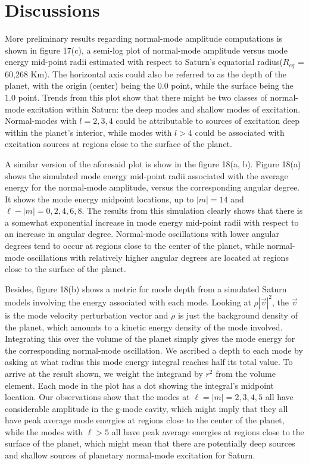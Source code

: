\documentclass{article}
\begin{document}
\section{Discussions}

More preliminary results regarding normal-mode amplitude computations is shown in figure 17(c), a semi-log plot of normal-mode amplitude versus mode energy mid-point radii estimated with respect to Saturn's equatorial radius($R_{eq}$ = 60,268 Km). The horizontal axis could also be referred to as the depth of the planet, with the origin (center) being the $0.0$ point, while the surface being the $1.0$ point. Trends from this plot show that there might be two classes of normal-mode excitation within Saturn: the deep modes and shallow modes of excitation. Normal-modes with $l = 2,3,4$ could be attributable to sources of excitation deep within the planet's interior, while modes with $l>4$ could be associated with excitation sources at regions close to the surface of the planet.

A similar version of the aforesaid plot is show in the figure 18(a, b). Figure 18(a) shows the simulated mode energy mid-point radii associated with the average energy for the normal-mode amplitude, versus the corresponding angular degree. It shows the mode energy midpoint locations, up to $|m|=14$ and $\ell-|m|=0,2,4,6,8$. The results from this simulation clearly shows that there is a somewhat exponential increase in mode energy mid-point radii with respect to an increase in angular degree. Normal-mode oscillations with lower angular degrees tend to occur at regions close to the center of the planet, while normal-mode oscillations with relatively higher angular degrees are located at regions close to the surface of the planet.

Besides, figure 18(b) shows a metric for mode depth from a simulated Saturn models involving the energy associated with each mode. Looking at $\rho |\vec v|^{2}$, the $\vec v$ is the mode velocity perturbation vector and $\rho$ is just the background density of the planet, which amounts to a kinetic energy density of the mode involved. Integrating this over the volume of the planet simply gives the mode energy for the corresponding normal-mode oscillation. We ascribed a depth to each mode by asking at what radius this mode energy integral reaches half its total value. To arrive at the result shown, we weight the integrand by $r^{2}$ from the volume element. Each mode in the plot has a dot showing the integral's midpoint location. Our observations show that the modes at $\ell=|m|=2,3,4,5$ all have considerable amplitude in the g-mode cavity, which might imply that they all have peak average mode energies at regions close to the center of the planet, while the modes with $\ell > 5$ all have peak average energies at regions close to the surface of the planet, which might mean that there are potentially deep sources and shallow sources of planetary normal-mode excitation for Saturn.
\end{document}
